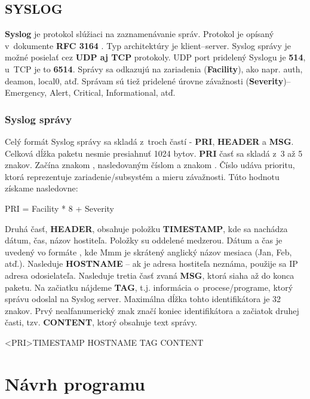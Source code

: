 \section{SYSLOG}
\textbf{Syslog} je protokol slúžiaci na zaznamenávanie správ. Protokol je opísaný v~dokumente \textbf{RFC 3164} \cite{rfc3164}. Typ architektúry je klient--server. Syslog správy je možné posielať cez \textbf{UDP aj TCP} protokoly. UDP port pridelený Syslogu je \textbf{514}, u~TCP je to \textbf{6514}. Správy sa odkazujú na zariadenia (\textbf{Facility}), ako napr. auth, deamon, local0, atď. Správam sú tiež pridelené úrovne závažnosti (\textbf{Severity})-- Emergency, Alert, Critical, Informational, atď.

\subsection{Syslog správy}
Celý formát Syslog správy sa skladá z~troch častí - \textbf{PRI}, \textbf{HEADER} a \textbf{MSG}. Celková dĺžka paketu nesmie presiahnuť 1024 bytov. \textbf{PRI} časť sa skladá z~3 až 5 znakov. Začína znakom \uv{<}, nasledovaným číslom a znakom \uv{>}. Číslo udáva prioritu, ktorá reprezentuje zariadenie/subsystém a mieru závažnosti. Túto hodnotu získame nasledovne:
\begin{framed} 
PRI = Facility * 8 + Severity
\end{framed}
Druhá časť, \textbf{HEADER}, obsahuje položku \textbf{TIMESTAMP}, kde sa nachádza dátum, čas, názov hostiteľa. Položky su oddelené medzerou. Dátum a čas je uvedený vo formáte , kde Mmm je skrátený anglický názov mesiaca (Jan, Feb, atď.). Nasleduje \textbf{HOSTNAME} -- ak je adresa hostiteľa neznáma, použije sa IP adresa odosielateľa. Nasleduje tretia časť zvaná \textbf{MSG}, ktorá siaha až do konca paketu. Na začiatku nájdeme \textbf{TAG}, t.j. informácia o~procese/programe, ktorý správu odoslal na Syslog server. Maximálna dĺžka tohto identifikátora je 32 znakov. Prvý nealfanumerický znak značí koniec identifikátora a začiatok druhej časti, tzv. \textbf{CONTENT}, ktorý obsahuje text správy.

\begin{framed}
<PRI>TIMESTAMP HOSTNAME TAG CONTENT
\end{framed}
	
\chapter{Návrh programu}

